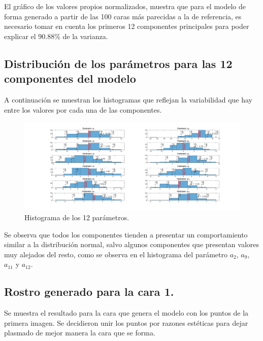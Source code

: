 \documentclass[11pt, letterpaper]{article}
\begin{document}
El gráfico de los valores propios normalizados, muestra que para el modelo de forma generado a partir de las 100 caras más parecidas a la de referencia, es necesario tomar en cuenta los primeros 12 componentes principales para poder explicar el  90.88\% de la varianza.

\newpage

\subsection{Distribución de los parámetros para las 12 componentes del modelo}

A continuación se muestran los histogramas que reflejan la variabilidad que hay entre los valores por cada una de las componentes.

\begin{figure}[h!]
	\centering %
	\includegraphics[width=1.35\textwidth]{IMG/G2.png} %
	\caption{Histograma de los 12 parámetros.}
	\label{fig:f3}
\end{figure}

Se observa que todos los componentes tienden a presentar un  comportamiento similar a la distribución normal, salvo algunos componentes que presentan valores muy alejados del resto, como se observa en el histograma del parámetro $a_2$, $a_9$, $a_{11}$ y $a_{12}$. 

\newpage

\subsection{Rostro generado para la cara 1.}

Se muestra el resultado para la cara que genera el modelo con los puntos de la primera imagen. Se decidieron unir los puntos por razones estéticas para dejar plasmado de mejor manera la cara que se forma.
\end{document}
